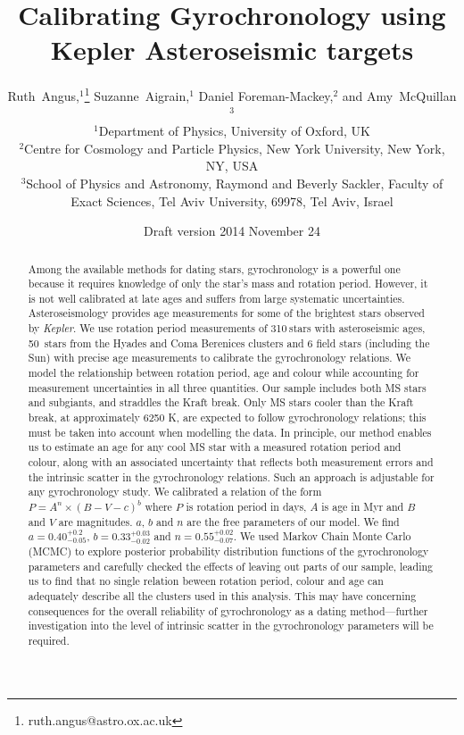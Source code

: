 \documentclass[useAMS, usenatbib]{mn2e}
\title{Calibrating Gyrochronology using Kepler Asteroseismic targets}
\author[R.~Angus \emph{et al.}]{%
    Ruth~Angus,$^1$\thanks{ruth.angus@astro.ox.ac.uk}
    Suzanne~Aigrain,$^1$
    Daniel Foreman-Mackey,$^2$ and
    Amy~McQuillan$^3$ \\
    $^1$Department of Physics, University of Oxford, UK \\
    $^2$Centre for Cosmology and Particle Physics, New York University, New York, NY, USA \\
    $^3$School of Physics and Astronomy, Raymond and Beverly Sackler, Faculty of Exact Sciences, Tel Aviv University, 69978, Tel Aviv, Israel}
\newcommand{\nastero}{310}
\newcommand{\nHC}{50~}
\newcommand{\gyroa}{0.40}
\newcommand{\aerrp}{0.2}
\newcommand{\aerrm}{0.05}
\newcommand{\gyron}{0.55}
\newcommand{\nerrp}{0.02}
\newcommand{\nerrm}{0.07}
\newcommand{\gyrob}{0.33}
\newcommand{\berrp}{0.03}
\newcommand{\berrm}{0.02}
\begin{document}
\date{Draft version 2014 November 24}
\maketitle

\begin{abstract}

Among the available methods for dating stars, gyrochronology is a powerful one
because it requires knowledge of only the star's mass and rotation period.
However, it is not well calibrated at late ages and suffers from large
systematic uncertainties.
Asteroseismology provides age measurements for some of the brightest stars
observed by {\it Kepler}.
We use rotation period measurements of \nastero$~$stars with asteroseismic
ages, \nHC stars from the Hyades and Coma Berenices clusters and 6 field stars
(including the Sun) with precise age measurements to calibrate the
gyrochronology relations.
We model the relationship between rotation period, age and colour while
accounting for measurement uncertainties in all three quantities.
Our sample includes both MS stars and subgiants, and straddles the Kraft break.
Only MS stars cooler than the Kraft break, at approximately 6250 K, are
expected to follow gyrochronology relations; this must be taken into account
when modelling the data.
In principle, our method enables us to estimate an age for any cool MS star
with a measured rotation period and colour, along with an associated
uncertainty that reflects both measurement errors and the intrinsic scatter in
the gyrochronology relations.
Such an approach is adjustable for any gyrochronology study.
We calibrated a relation of the form $P=A^n\times(B-V-c)^b$ where $P$ is
rotation period in days, $A$ is age in Myr and $B$ and $V$ are magnitudes.
$a$, $b$ and $n$ are the free parameters of our model.
We find $a = \gyroa^{+\aerrp}_{-\aerrm}$, $b = \gyrob^{+\berrp}_{-\berrm}$ and
$n = \gyron^{+\nerrp}_{-\nerrm}$.
We used Markov Chain Monte Carlo (MCMC) to explore posterior probability
distribution functions of the gyrochronology parameters and carefully checked
the effects of leaving out parts of our sample, leading us to find that no
single relation beween rotation period, colour and age can adequately describe
all the clusters used in this analysis.
This may have concerning consequences for the overall reliability of
gyrochronology as a dating method---further investigation into the level of
intrinsic scatter in the gyrochronology parameters will be required.

\end{abstract}
\end{document}
